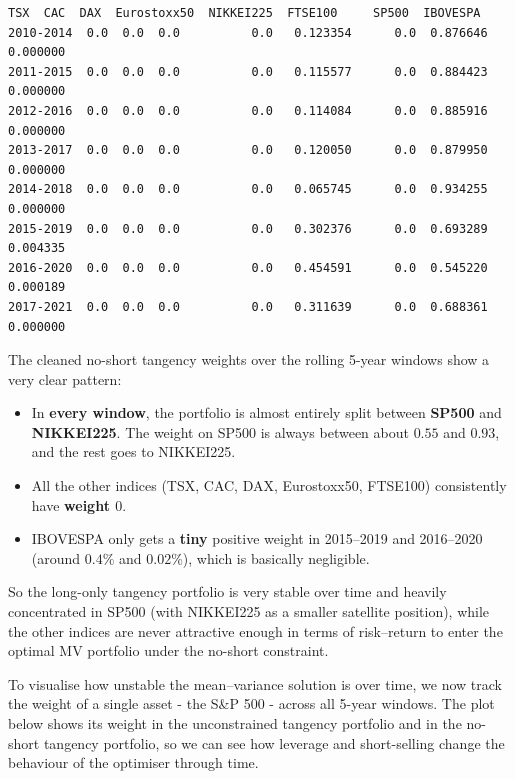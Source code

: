 \documentclass[11pt]{article}
\providecommand{\tightlist}{%
      \setlength{\itemsep}{0pt}\setlength{\parskip}{0pt}}
\begin{document}
            \begin{tcolorbox}[breakable, size=fbox, boxrule=.5pt, pad at break*=1mm, opacityfill=0]
\begin{Verbatim}[commandchars=\\\{\}]
           TSX  CAC  DAX  Eurostoxx50  NIKKEI225  FTSE100     SP500  IBOVESPA
2010-2014  0.0  0.0  0.0          0.0   0.123354      0.0  0.876646  0.000000
2011-2015  0.0  0.0  0.0          0.0   0.115577      0.0  0.884423  0.000000
2012-2016  0.0  0.0  0.0          0.0   0.114084      0.0  0.885916  0.000000
2013-2017  0.0  0.0  0.0          0.0   0.120050      0.0  0.879950  0.000000
2014-2018  0.0  0.0  0.0          0.0   0.065745      0.0  0.934255  0.000000
2015-2019  0.0  0.0  0.0          0.0   0.302376      0.0  0.693289  0.004335
2016-2020  0.0  0.0  0.0          0.0   0.454591      0.0  0.545220  0.000189
2017-2021  0.0  0.0  0.0          0.0   0.311639      0.0  0.688361  0.000000
\end{Verbatim}
\end{tcolorbox}
        
    The cleaned no-short tangency weights over the rolling 5-year windows
show a very clear pattern:

\begin{itemize}
\tightlist
\item
  In \textbf{every window}, the portfolio is almost entirely split
  between \textbf{SP500} and \textbf{NIKKEI225}. The weight on SP500 is
  always between about \(0.55\) and \(0.93\), and the rest goes to
  NIKKEI225.
\item
  All the other indices (TSX, CAC, DAX, Eurostoxx50, FTSE100)
  consistently have \textbf{weight \(0\)}.
\item
  IBOVESPA only gets a \textbf{tiny} positive weight in 2015--2019 and
  2016--2020 (around \(0.4\%\) and \(0.02\%\)), which is basically
  negligible.
\end{itemize}

So the long-only tangency portfolio is very stable over time and heavily
concentrated in SP500 (with NIKKEI225 as a smaller satellite position),
while the other indices are never attractive enough in terms of
risk--return to enter the optimal MV portfolio under the no-short
constraint.

    To visualise how unstable the mean--variance solution is over time, we
now track the weight of a single asset - the S\&P 500 - across all
5-year windows. The plot below shows its weight in the unconstrained
tangency portfolio and in the no-short tangency portfolio, so we can see
how leverage and short-selling change the behaviour of the optimiser
through time.
\end{document}
